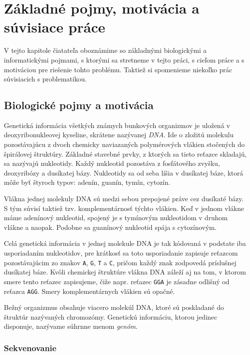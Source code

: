 \chapter{Základné pojmy, motivácia a súvisiace práce}

V tejto kapitole čiatateľa oboznámime so základnými biologickými
a informatickými pojmami, s ktorými sa stretneme v tejto práci, s cieľom práce
a s motiváciou pre riešenie tohto problému. Taktiež si spomenieme niekoľko
prác súvisiacich s problematikou.

\section{Biologické pojmy a motivácia}

Genetická informácia všetkých známych bunkových organizmov je uložená v
deoxyribonukleovej kyseline, skrátene nazývanej \emph{DNA}. Ide o zložitú molekulu
pozostávajúcu z dvoch chemicky naviazaných polymérových vlákien stočených
do špirálovej štruktúry. Základné stavebné prvky, z ktorých sa tieto reťazce
skladajú, sa nazývajú nukleotidy. Každý nukleotid pozostáva
z fosfátového zvyšku, deoxyribózy a dusíkatej bázy. Nukleotidy sa od seba líšia
v dusíkatej báze, ktorá môže byť štyroch typov: adenín, guanín, tymín, cytozín.

Vlákna jednej molekuly DNA sú medzi sebou prepojené práve cez dusíkaté bázy.
S tým súvisí taktiež tzv. komplementárnosť týchto vlákien. Keď v jednom vlákne
máme adenínový nukleotid, spojený je s tymínovým nukleotidom v druhom vlákne
a naopak. Podobne sa guanínový nukleotid spája s cytozínovým.

Celá genetická informácia v jednej molekule DNA je tak kódovaná v podstate iba usporiadaním nukleotidov,
pre krátkosť sa toto usporiadanie zapisuje reťazcom pozostávajúcim
zo znakov \verb_A_, \verb_G_, \verb_T_ a \verb_C_, pričom každý znak zodpovedá
príslušnej dusíkatej báze. Kvôli chemickej štruktúre vlákna DNA záleží aj na tom,
v ktorom smere tento reťazec zapisujeme, čiže napr. reťazec \verb_GGA_ je
zásadne odlišný od reťazca \verb_AGG_. Smery komplementárnych vlákien sú opačné.

Bežný organizmus obsahuje viacero molekúl DNA, ktoré sú poskladané do štruktúr
nazývaných chromozómy. Genetickú informáciu, ktorou jedinec disponuje,
nazývame súhrnne menom \emph{genóm}.

\subsection{Sekvenovanie}

